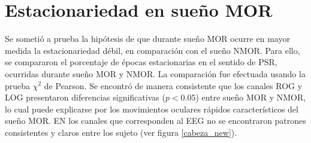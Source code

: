 \section{Estacionariedad en sueño MOR}

Se sometió a prueba la hipótesis de que durante sueño MOR ocurre en mayor medida la estacionariedad
débil, en comparación con el sueño NMOR. Para ello, se compararon el porcentaje de épocas 
estacionarias en el sentido de PSR, ocurridas durante sueño MOR y NMOR. La comparación fue efectuada
usando la prueba $\chi^{2}$ de Pearson. Se encontró
de manera consistente que los canales ROG y LOG presentaron diferencias significativas ($p<0.05$) 
entre sueño MOR y NMOR, lo cual puede explicarse por los movimientos oculares rápidos característicos
del sueño MOR. EN los canales que corresponden al EEG no se encontraron patrones consistentes y 
claros entre los sujeto (ver figura \ref{cabeza_new}).

%
%

